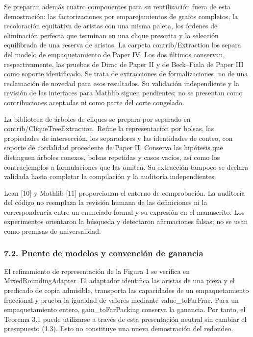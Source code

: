 \documentclass[spanish,11pt,a4paper]{article}
\begin{document}
Se preparan además cuatro componentes para su reutilización fuera de esta demostración: las factorizaciones por emparejamientos de grafos completos, la recoloración equitativa de aristas con una misma paleta, los órdenes de eliminación perfecta que terminan en una clique prescrita y la selección equilibrada de una reserva de aristas. La carpeta {\ttfamily\small contrib/\discretionary{\hbox{\ensuremath{\hookrightarrow}}}{}{}Extraction} los separa del modelo de empaquetamiento de Paper IV. Los dos últimos conservan, respectivamente, las pruebas de Dirac de Paper II y de Beck--Fiala de Paper III como soporte identificado. Se trata de extracciones de formalizaciones, no de una reclamación de novedad para esos resultados. Su validación independiente y la revisión de las interfaces para Mathlib siguen pendientes; no se presentan como contribuciones aceptadas ni como parte del corte congelado.

La biblioteca de árboles de cliques se prepara por separado en {\ttfamily\small contrib/\discretionary{\hbox{\ensuremath{\hookrightarrow}}}{}{}CliqueTreeEx\discretionary{\hbox{\ensuremath{\hookrightarrow}}}{}{}traction}. Reúne la representación por bolsas, las propiedades de intersección, los separadores y las identidades de conteo, con soporte de cordalidad procedente de Paper II. Conserva las hipótesis que distinguen árboles conexos, bolsas repetidas y casos vacíos, así como los contraejemplos a formulaciones que las omiten. Su extracción tampoco se declara validada hasta completar la compilación y la auditoría independientes.

Lean {[}10{]} y Mathlib {[}11{]} proporcionan el entorno de comprobación. La auditoría del código no reemplaza la revisión humana de las definiciones ni la correspondencia entre un enunciado formal y su expresión en el manuscrito. Los experimentos orientaron la búsqueda y detectaron afirmaciones falsas; no se usan como premisas de universalidad.

\subsubsection{7.2. Puente de modelos y convención de ganancia}\label{puente-de-modelos-y-convencion-de-ganancia}

El refinamiento de representación de la Figura 1 se verifica en {\ttfamily\small MixedRoundin\discretionary{\hbox{\ensuremath{\hookrightarrow}}}{}{}gAdapter}. El adaptador identifica las aristas de una pieza y el predicado de copia admisible, transporta las capacidades de un empaquetamiento fraccional y prueba la igualdad de valores mediante {\ttfamily\small value\_\discretionary{\hbox{\ensuremath{\hookrightarrow}}}{}{}toFarFrac}. Para un empaquetamiento entero, {\ttfamily\small gain\_\discretionary{\hbox{\ensuremath{\hookrightarrow}}}{}{}toFarPacking} conserva la ganancia. Por tanto, el Teorema 3.1 puede utilizarse a través de esta presentación neutral sin cambiar el presupuesto (1.3). Esto no constituye una nueva demostración del redondeo.
\end{document}
